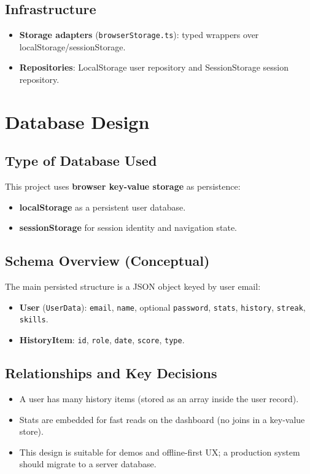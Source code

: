 \documentclass[11pt]{article}
\begin{document}
\subsection{Infrastructure}
\begin{itemize}[leftmargin=1.2em]
  \item \textbf{Storage adapters} (\texttt{browserStorage.ts}): typed wrappers over localStorage/sessionStorage.
  \item \textbf{Repositories}: LocalStorage user repository and SessionStorage session repository.
\end{itemize}

\section{Database Design}

\subsection{Type of Database Used}
This project uses \textbf{browser key-value storage} as persistence:
\begin{itemize}[leftmargin=1.2em]
  \item \textbf{localStorage} as a persistent user database.
  \item \textbf{sessionStorage} for session identity and navigation state.
\end{itemize}

\subsection{Schema Overview (Conceptual)}
The main persisted structure is a JSON object keyed by user email:
\begin{itemize}[leftmargin=1.2em]
  \item \textbf{User} (\texttt{UserData}): \texttt{email}, \texttt{name}, optional \texttt{password}, \texttt{stats}, \texttt{history}, \texttt{streak}, \texttt{skills}.
  \item \textbf{HistoryItem}: \texttt{id}, \texttt{role}, \texttt{date}, \texttt{score}, \texttt{type}.
\end{itemize}

\subsection{Relationships and Key Decisions}
\begin{itemize}[leftmargin=1.2em]
  \item A user has many history items (stored as an array inside the user record).
  \item Stats are embedded for fast reads on the dashboard (no joins in a key-value store).
  \item This design is suitable for demos and offline-first UX; a production system should migrate to a server database.
\end{itemize}
\end{document}
